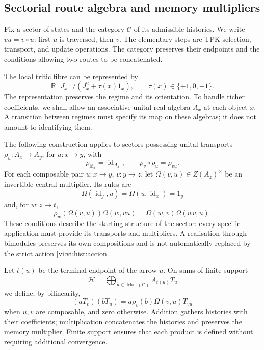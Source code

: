 \subsection{Sectorial route algebra and memory multipliers}
\label{vi:vi:hist:algebra}

Fix a sector of states and the category \(\mathcal C\) of its
admissible histories. We write \(vu=v\circ u\): first
\(u\) is traversed, then \(v\). The elementary steps are TPK
selection, transport, and update operations. The category preserves
their endpoints and the conditions allowing two routes to be concatenated.

The local tritic fibre can be represented by
\[
 \mathbb R[J_x]/(J_x^2+\tau(x)1_x),
 \qquad \tau(x)\in\{+1,0,-1\}.
\]
The representation preserves the regime and its orientation. To handle
richer coefficients, we shall allow an associative unital real
algebra \(A_x\) at each object \(x\). A transition between regimes
must specify its map on these algebras; it does not amount to identifying them.

The following construction applies to sectors possessing unital
transports \(\rho_u:A_x\to A_y\), for \(u:x\to y\), with
\begin{equation}
 \rho_{\operatorname{id}_x}=\operatorname{id}_{A_x},\qquad
 \rho_v\circ\rho_u=\rho_{vu}.
 \label{vi:vi:hist:accion}
\end{equation}
For each composable pair \(u:x\to y\), \(v:y\to z\), let
\(\Omega(v,u)\in Z(A_z)^\times\) be an invertible central multiplier.
Its rules are
\begin{equation}
 \Omega(\operatorname{id}_y,u)
 =\Omega(u,\operatorname{id}_x)=1_y
 \label{vi:vi:hist:normalizacion}
\end{equation}
and, for \(w:z\to t\),
\begin{equation}
 \rho_w\!\left(\Omega(v,u)\right)\Omega(w,vu)
 =\Omega(w,v)\Omega(wv,u).
 \label{vi:vi:hist:cociclo}
\end{equation}
These conditions describe the starting structure of the sector: every
specific application must provide its transports and multipliers.
A realisation through bimodules preserves its own compositions and
is not automatically replaced by the strict action
\eqref{vi:vi:hist:accion}.

Let \(t(u)\) be the terminal endpoint of the arrow \(u\). On sums
of finite support
\[
 \mathcal H=\bigoplus_{u\in\operatorname{Mor}(\mathcal C)}A_{t(u)}T_u
\]
we define, by bilinearity,
\begin{equation}
 (aT_v)(bT_u)=
 a\rho_v(b)\Omega(v,u)T_{vu}
 \label{vi:vi:hist:producto}
\end{equation}
when \(u,v\) are composable, and zero otherwise. Addition gathers
histories with their coefficients; multiplication concatenates the histories and
preserves the memory multiplier. Finite support ensures that each
product is defined without requiring additional convergence.

